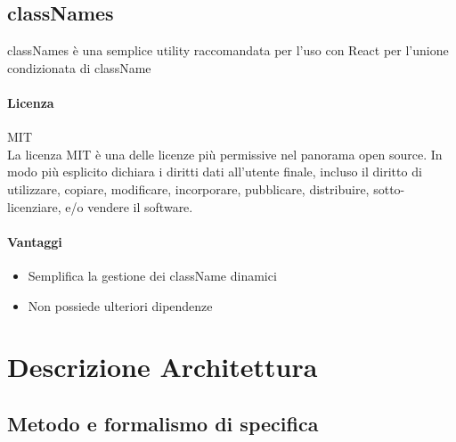 \subsection{classNames}

classNames è una semplice utility raccomandata per l'uso con React per l'unione condizionata di className

\paragraph{Licenza} MIT \\
La licenza MIT è una delle licenze più permissive nel panorama open
source. In modo più esplicito dichiara i diritti dati all'utente
finale, incluso il diritto di utilizzare, copiare, modificare,
incorporare, pubblicare, distribuire, sotto-licenziare, e/o vendere il
software. 
\\

\paragraph{Vantaggi}
\begin{itemize}
	\item Semplifica la gestione dei className dinamici 
	\item Non possiede ulteriori dipendenze 
\end{itemize}


\section{Descrizione Architettura}
\subsection{Metodo e formalismo di specifica}

